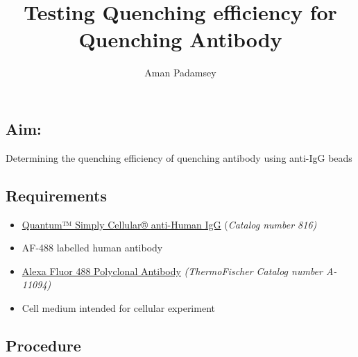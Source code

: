 \documentclass[
  letterpaper,
  DIV=11,
  numbers=noendperiod]{scrartcl}
\title{Testing Quenching efficiency for Quenching Antibody}
\author{Aman Padamsey}
\date{}
\begin{document}
\maketitle
\ifdefined\Shaded\renewenvironment{Shaded}{\begin{tcolorbox}[interior hidden, borderline west={3pt}{0pt}{shadecolor}, enhanced, boxrule=0pt, breakable, sharp corners, frame hidden]}{\end{tcolorbox}}\fi

\hypertarget{aim}{%
\subsection{Aim:}\label{aim}}

Determining the quenching efficiency of quenching antibody using
anti-IgG beads

\hypertarget{requirements}{%
\subsection{Requirements}\label{requirements}}

\begin{itemize}
\item
  \href{https://www.bangslabs.com/product-selection/816}{Quantum™ Simply
  Cellular® anti-Human IgG} (\emph{Catalog number 816)}
\item
  AF-488 labelled human antibody
\item
  \href{https://www.thermofisher.com/antibody/product/Alexa-Fluor-488-Antibody-Polyclonal/A-11094}{Alexa
  Fluor 488 Polyclonal Antibody} \emph{(ThermoFischer Catalog number
  A-11094)}
\item
  Cell medium intended for cellular experiment
\end{itemize}

\hypertarget{procedure}{%
\subsection{Procedure}\label{procedure}}
\end{document}
